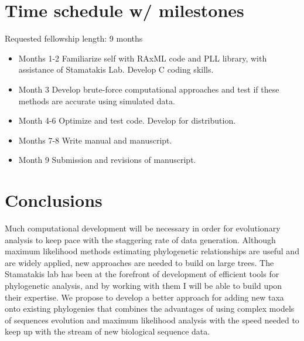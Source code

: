 \documentclass[10pt]{article}
\begin{document}
         
\section*{Time schedule w/ milestones}
   Requested fellowship length: 9 months
 
\begin{itemize}
  \item{Months 1-2} Familiarize self with RAxML code and PLL library, with assistance of Stamatakis Lab. 
Develop C coding skills.
  \item{Month 3} Develop brute-force computational approaches and test if these methods are accurate using simulated data.
  \item{Month 4-6} Optimize and test code. Develop for distribution.
  \item{Months 7-8} Write manual and manuscript.
  \item{Month 9} Submission and revisions of manuscript.
\end{itemize}


\section*{Conclusions}
Much computational development will be necessary in order for evolutionary analysis to keep pace with the staggering rate of data generation. 
Although maximum likelihood methods estimating phylogenetic relationships are useful and are widely applied, new approaches are needed to build on large trees. 
The Stamatakis lab has been at the forefront of development of efficient tools for phylogenetic analysis, and by working with them I will be able to build upon their expertise. 
We propose to develop a better approach for adding new taxa onto existing phylogenies that combines the advantages of using complex models of sequences evolution and maximum likelihood analysis with the speed needed to keep up with the stream of new biological sequence data. 



\end{document}
